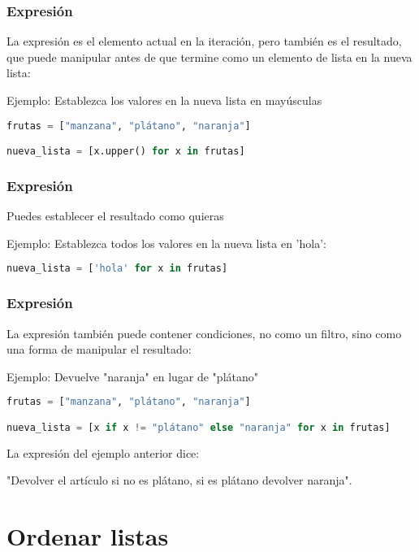 \begin{frame}[fragile]
  \frametitle{Expresión}

  La expresión es el elemento actual en la iteración,
  pero también es el resultado, que puede manipular antes de que
  termine como un elemento de lista en la nueva lista:

  \vspace{\baselineskip}
  Ejemplo: Establezca los valores en la nueva lista en mayúsculas
  \begin{lstlisting}[language=Python]
frutas = ["manzana", "plátano", "naranja"]

nueva_lista = [x.upper() for x in frutas]
  \end{lstlisting}
\end{frame}

\begin{frame}[fragile]
  \frametitle{Expresión}

  Puedes establecer el resultado como quieras

  \vspace{\baselineskip}
  Ejemplo: Establezca todos los valores en la nueva lista en 'hola':
  \begin{lstlisting}[language=Python]
nueva_lista = ['hola' for x in frutas]
  \end{lstlisting}
\end{frame}

\begin{frame}[fragile]
  \frametitle{Expresión}

  La expresión también puede contener condiciones,
  no como un filtro, sino como una forma de manipular el resultado:

  \vspace{\baselineskip}
  Ejemplo: Devuelve "naranja" en lugar de "plátano"
  \begin{lstlisting}[language=Python]
frutas = ["manzana", "plátano", "naranja"]

nueva_lista = [x if x != "plátano" else "naranja" for x in frutas]
  \end{lstlisting}

  La expresión del ejemplo anterior dice:

  \vspace{\baselineskip}
  "Devolver el artículo si no es plátano, si es plátano devolver naranja".
\end{frame}


\section{Ordenar listas}


